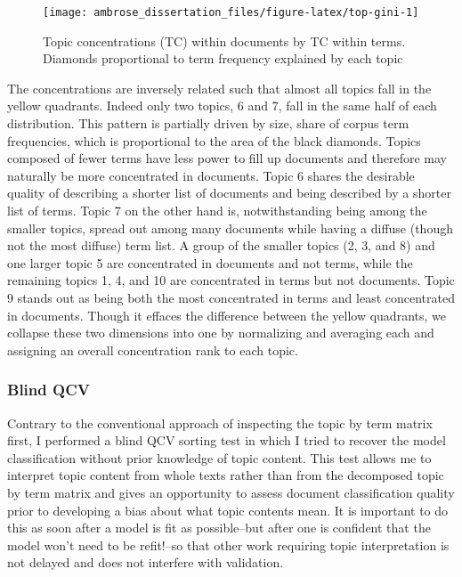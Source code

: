 \documentclass[]{book}
\theoremstyle{definition}
\theoremstyle{definition}
\theoremstyle{definition}
\theoremstyle{remark}
\begin{document}
\begin{figure}

{\centering \texttt{[image: ambrose\_dissertation\_files/figure-latex/top-gini-1]} 

}

\caption{Topic concentrations (TC) within documents by TC within terms. Diamonds proportional to term frequency explained by each topic}\label{fig:top-gini}
\end{figure}

The concentrations are inversely related such that almost all topics
fall in the yellow quadrants. Indeed only two topics, 6 and 7, fall in
the same half of each distribution. This pattern is partially driven by
size, share of corpus term frequencies, which is proportional to the
area of the black diamonds. Topics composed of fewer terms have less
power to fill up documents and therefore may naturally be more
concentrated in documents. Topic 6 shares the desirable quality of
describing a shorter list of documents and being described by a shorter
list of terms. Topic 7 on the other hand is, notwithstanding being among
the smaller topics, spread out among many documents while having a
diffuse (though not the most diffuse) term list. A group of the smaller
topics (2, 3, and 8) and one larger topic 5 are concentrated in
documents and not terms, while the remaining topics 1, 4, and 10 are
concentrated in terms but not documents. Topic 9 stands out as being
both the most concentrated in terms and least concentrated in documents.
Though it effaces the difference between the yellow quadrants, we
collapse these two dimensions into one by normalizing and averaging each
and assigning an overall concentration rank to each topic.

\hypertarget{blind-qcv}{%
\subsubsection{Blind QCV}\label{blind-qcv}}

Contrary to the conventional approach of inspecting the topic by term
matrix first, I performed a blind QCV sorting test in which I tried to
recover the model classification without prior knowledge of topic
content. This test allows me to interpret topic content from whole texts
rather than from the decomposed topic by term matrix and gives an
opportunity to assess document classification quality prior to
developing a bias about what topic contents mean. It is important to do
this as soon after a model is fit as possible--but after one is
confident that the model won't need to be refit!--so that other work
requiring topic interpretation is not delayed and does not interfere
with validation.
\end{document}
